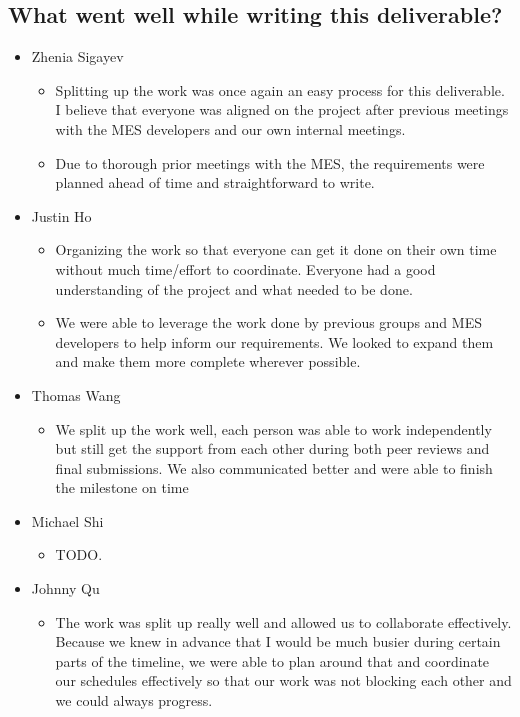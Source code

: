 \documentclass[12pt]{article}
\begin{document}
\begin{enumerate}
  \subsection{What went well while writing this deliverable?}
   \begin{itemize}
    \item Zhenia Sigayev
      \begin{itemize}[label=$\circ$]
        \item Splitting up the work was once again an easy process for this deliverable. I believe that everyone was aligned on the project after previous meetings with the MES developers and our own internal meetings.
        \item Due to thorough prior meetings with the MES, the requirements were planned ahead of time and straightforward to write.
      \end{itemize}
    \item Justin Ho
      \begin{itemize}[label=$\circ$]
        \item Organizing the work so that everyone can get it done on their own time without much time/effort to coordinate. Everyone had a good understanding of the project and what needed to be done.
        \item We were able to leverage the work done by previous groups and MES developers to help inform our requirements. We looked to expand them and make them more complete wherever possible.
      \end{itemize}
    \item Thomas Wang
      \begin{itemize}[label=$\circ$]
        \item We split up the work well, each person was able to work independently but still get the support from each other during both peer reviews and final submissions. We also communicated better and were able to finish the milestone on time
      \end{itemize}
    \item Michael Shi
      \begin{itemize}[label=$\circ$]
        \item TODO.
      \end{itemize}
    \item Johnny Qu
      \begin{itemize}[label=$\circ$]
        \item The work was split up really well and allowed us to collaborate effectively. Because we knew in advance that I would be much busier during certain parts of the timeline, we were able to plan around that and coordinate our schedules effectively so that our work was not blocking each other and we could always progress. 
      \end{itemize}
  \end{itemize}


\end{enumerate}
\end{document}
